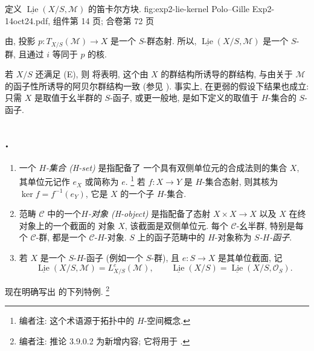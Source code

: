   {定义 \(\underline{\operatorname{Lie}}(X/S,\mathcal M)\) 的笛卡尔方块.}
  {fig:exp2-lie-kernel}
  {Polo--Gille Exp2-14oct24.pdf, 组件第 14 页; 合卷第 72 页}

由, 投影
\(p:T_{X/S}(\mathcal M)\to X\) 是一个 \(S\)-群态射.
所以, \(\underline{\operatorname{Lie}}(X/S,\mathcal M)\) 是一个
\(S\)-群, 且通过 \(i\) 等同于 \(p\) 的核.

若 \(X/S\) 还满足 (E), 则
将表明, 这个由 \(X\) 的群结构所诱导的群结构,
与由关于 \(\mathcal M\) 的函子性所诱导的阿贝尔群结构一致
(参见 ).
事实上, 在更弱的假设下结果也成立: 只需 \(X\) 是取值于幺半群的
\(S\)-函子, 或更一般地, 是如下定义的取值于 \(H\)-集合的 \(S\)-函子.

\subsection*{.}
\begin{enumerate}
\item[(a)] 一个 \emph{\(H\)-集合 (H-set)} 是指配备了
一个具有双侧单位元的合成法则的集合 \(X\),
其单位元记作 \(e_X\) 或简称为 \(e\).
\footnote{编者注: 这个术语源于拓扑中的 \(H\)-空间概念.}
若 \(f:X\to Y\) 是 \(H\)-集合态射, 则其核为
\(\ker f=f^{-1}(e_Y)\), 它是 \(X\) 的一个子 \(H\)-集合.

\item[(b)] 范畴 \(\mathscr C\) 中的一个\emph{\(H\)-对象 (H-object)}
是指配备了态射 \(X\times X\to X\) 以及 \(X\) 在终对象上的一个截面的
对象 \(X\), 该截面是双侧单位元.
每个 \(\mathscr C\)-幺半群, 特别是每个 \(\mathscr C\)-群,
都是一个 \(\mathscr C\)-\(H\)-对象.
\(S\) 上的函子范畴中的 \(H\)-对象称为 \emph{\(S\)-\(H\)-函子}.

\item[(c)] 若 \(X\) 是一个 \(S\)-\(H\)-函子 (例如一个
\(S\)-群), 且 \(e:S\to X\) 是其单位截面, 记
\[
  \underline{\operatorname{Lie}}(X/S,\mathcal M)=L^e_{X/S}(\mathcal M),
  \qquad
  \underline{\operatorname{Lie}}(X/S)
  =\underline{\operatorname{Lie}}(X/S,\mathcal O_S).
\]
\end{enumerate}

现在明确写出 
的下列特例.
\footnote{编者注: 推论 3.9.0.2 为新增内容;
它将用于 .}

